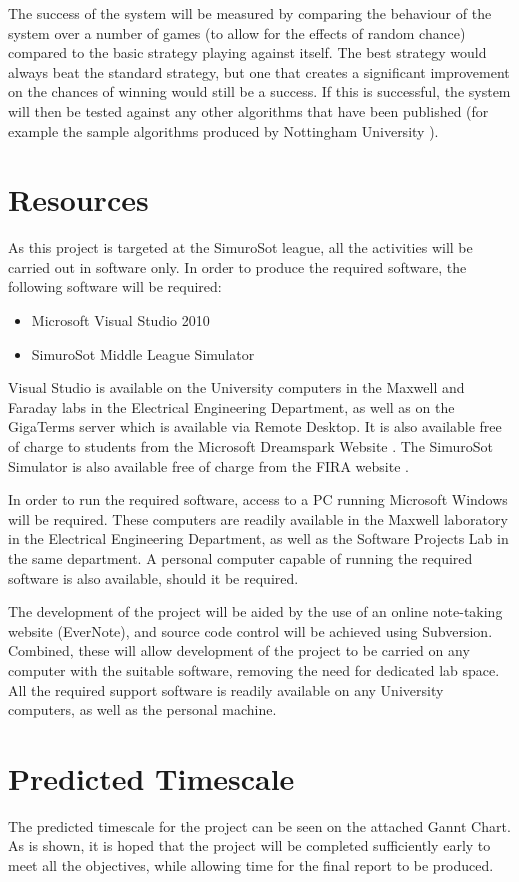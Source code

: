 \documentclass[a4paper,10pt]{article}
\begin{document}
The success of the system will be measured by comparing the behaviour of the system over a number of games (to allow for the effects of random chance) compared to the basic strategy playing against itself.  The best strategy would always beat the standard strategy, but one that creates a significant improvement on the chances of winning would still be a success.  If this is successful, the system will then be tested against any other algorithms that have been published (for example the sample algorithms produced by Nottingham University \cite{nottsWebsiteStrategy}).

\section{Resources}
As this project is targeted at the SimuroSot league, all the activities will be carried out in software only.  In order to produce the required software, the following software will be required:

\begin{itemize}
 \item Microsoft Visual Studio 2010
 \item SimuroSot Middle League Simulator
\end{itemize}

Visual Studio is available on the University computers in the Maxwell and Faraday labs in the Electrical Engineering Department, as well as on the GigaTerms server which is available via Remote Desktop.  It is also available free of charge to students from the Microsoft Dreamspark Website \cite{dreamsparkVS}. The SimuroSot Simulator is also available free of charge from the \ac{FIRA} website \cite{simurosotSim}.

In order to run the required software, access to a PC running Microsoft Windows will be required.  These computers are readily available in the Maxwell laboratory in the Electrical Engineering Department, as well as the Software Projects Lab in the same department.  A personal computer capable of running the required software is also available, should it be required.

The development of the project will be aided by the use of an online note-taking website (EverNote), and source code control will be achieved using Subversion.  Combined, these will allow development of the project to be carried on any computer with the suitable software, removing the need for dedicated lab space.  All the required support software is readily available on any University computers, as well as the personal machine.

\section{Predicted Timescale}
The predicted timescale for the project can be seen on the attached Gannt Chart.  As is shown, it is hoped that the project will be completed sufficiently early to meet all the objectives, while allowing time for the final report to be produced.

\cleardoublepage

{}

\end{document}
